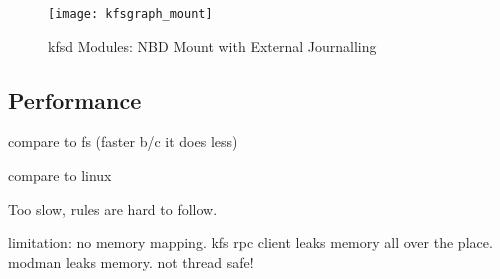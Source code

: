 \begin{figure}[htb]
\begin{center}
  \texttt{[image: kfsgraph\_mount]}
  \caption{kfsd Modules: NBD Mount with External Journalling}
  \label{fig:kfsgraph-mount}
\end{center}
\end{figure}


\subsection{Performance}

compare to fs (faster b/c it does less)

compare to linux

Too slow, rules are hard to follow.

limitation: no memory mapping. kfs rpc client leaks memory all over
the place. modman leaks memory. not thread safe!
